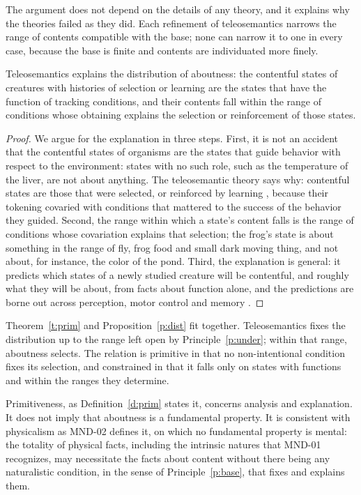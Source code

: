 \documentclass{situationist-preprint}
\begin{document}
The argument does not depend on the details of any theory, and it explains why the theories failed as they did. Each refinement of teleosemantics narrows the range of contents compatible with the base; none can narrow it to one in every case, because the base is finite and contents are individuated more finely.

\begin{proposition}\label{p:dist}
Teleosemantics explains the distribution of aboutness: the contentful states of creatures with histories of selection or learning are the states that have the function of tracking conditions, and their contents fall within the range of conditions whose obtaining explains the selection or reinforcement of those states.
\end{proposition}

\begin{proof}
We argue for the explanation in three steps. First, it is not an accident that the contentful states of organisms are the states that guide behavior with respect to the environment: states with no such role, such as the temperature of the liver, are not about anything. The teleosemantic theory says why: contentful states are those that were selected, or reinforced by learning \citep{Dretske1988}, because their tokening covaried with conditions that mattered to the success of the behavior they guided. Second, the range within which a state's content falls is the range of conditions whose covariation explains that selection; the frog's state is about something in the range of fly, frog food and small dark moving thing, and not about, for instance, the color of the pond. Third, the explanation is general: it predicts which states of a newly studied creature will be contentful, and roughly what they will be about, from facts about function alone, and the predictions are borne out across perception, motor control and memory \citep{Shea2018}.
\end{proof}

Theorem~\ref{t:prim} and Proposition~\ref{p:dist} fit together. Teleosemantics fixes the distribution up to the range left open by Principle~\ref{p:under}; within that range, aboutness selects. The relation is primitive in that no non-intentional condition fixes its selection, and constrained in that it falls only on states with functions and within the ranges they determine.

\begin{remark}
Primitiveness, as Definition~\ref{d:prim} states it, concerns analysis and explanation. It does not imply that aboutness is a fundamental property. It is consistent with physicalism as MND-02 defines it, on which no fundamental property is mental: the totality of physical facts, including the intrinsic natures that MND-01 recognizes, may necessitate the facts about content without there being any naturalistic condition, in the sense of Principle~\ref{p:base}, that fixes and explains them.
\end{remark}
\end{document}
